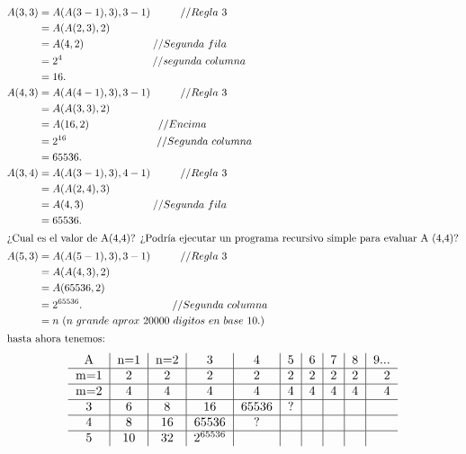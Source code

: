 \documentclass{article}
\begin{document}
\begin{align*}
            A(3,3) &= A(A(3-1),3),3-1) \hspace*{1cm} // Regla~3\\
                   &= A(A(2,3), 2) \hspace*{2cm} \\
				   &=A(4,2)	\hspace*{2,3cm} // Segunda~fila \\
				   &=2^{4} \hspace*{3cm} // segunda~columna\\
				   &=16.\\
 A(4,3) &= A(A(4-1),3),3-1) \hspace*{1cm} // Regla~3\\
                   &= A(A(3,3), 2) \hspace*{2cm} \\
				   &=A(16,2)	\hspace*{2,3cm} // Encima\\
				   &=2^{16} \hspace*{3cm} // Segunda~columna\\
				   &=65536.\\
 A(3,4) &= A(A(3-1),3),4-1) \hspace*{1cm} // Regla~3\\
                   &= A(A(2,4), 3) \hspace*{2cm} \\
				   &=A(4,3)	\hspace*{2,3cm} // Segunda~fila\\
				   &=65536.\\				   			   
\intertext{¿Cual es el valor de A(4,4)?  
¿Podría ejecutar un programa recursivo simple para evaluar A (4,4)?}
 A(5,3) &= A(A(5-1),3),3-1) \hspace*{1cm} // Regla~3\\
                   &= A(A(4,3), 2) \hspace*{2cm} \\
				   &=A(65536,2)	\hspace*{2,3cm}\\
				   &=2^{65536}.\hspace*{3cm}// Segunda~columna\\
				   &=n~(n~ grande~aprox~20000~digitos~en~base~10.)\\
\intertext{hasta ahora tenemos:}
\end{align*}
\begin{equation*}
\begin{tabular}{ c| c| c| c| c| c| c| c| c| r }
     A & n=1 & n=2 & 3 & 4 & 5 & 6 & 7 & 8 & 9... \\
   \hline
   m=1 & 2 & 2 & 2 & 2 & 2 & 2 & 2 & 2 & 2 \\
   \hline
   m=2 & 4 & 4 & 4 & 4 & 4 & 4 & 4 & 4 & 4 \\
   \hline
   3   & 6 & 8 & 16 & 65536 & ? &  &  &  &  \\
   \hline
   4   & 8 & 16 & 65536 & ? &  &  &  &  &  \\
   \hline
   5  & 10 & 32 & $2^{65536}$ &  &  &  &  &  &  \\
\end{tabular}
\end{equation*}
\end{document}
